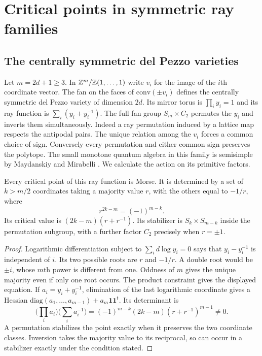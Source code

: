 \section{Critical points in symmetric ray families}\label{sec:example}

\subsection{The centrally symmetric del Pezzo varieties}
Let $m=2d+1\ge3$. In $\mathbb Z^m/\mathbb Z(1,\ldots,1)$ write $v_i$ for the image of the $i$th coordinate vector. The fan on the faces of $\mathrm{conv}(\pm v_i)$ defines the centrally symmetric del Pezzo variety of dimension $2d$. Its mirror torus is $\prod_i y_i=1$ and its ray function is $\sum_i(y_i+y_i^{-1})$. The full fan group $S_m\times C_2$ permutes the $y_i$ and inverts them simultaneously. Indeed a ray permutation induced by a lattice map respects the antipodal pairs. The unique relation among the $v_i$ forces a common choice of sign. Conversely every permutation and either common sign preserves the polytope. The small monotone quantum algebra in this family is semisimple by Maydanskiy and Mirabelli \cite{MM}. We calculate the action on its primitive factors.

\begin{proposition}
Every critical point of this ray function is Morse. It is determined by a set of $k>m/2$ coordinates taking a majority value $r$, with the others equal to $-1/r$, where
\[
             r^{2k-m}=(-1)^{m-k}.
\]
Its critical value is $(2k-m)(r+r^{-1})$. Its stabilizer is $S_k\times S_{m-k}$ inside the permutation subgroup, with a further factor $C_2$ precisely when $r=\pm1$.
\end{proposition}
\begin{proof}
Logarithmic differentiation subject to $\sum_i d\log y_i=0$ says that $y_i-y_i^{-1}$ is independent of $i$. Its two possible roots are $r$ and $-1/r$. A double root would be $\pm i$, whose $m$th power is different from one. Oddness of $m$ gives the unique majority even if only one root occurs. The product constraint gives the displayed equation. If $a_i=y_i+y_i^{-1}$, elimination of the last logarithmic coordinate gives a Hessian $\mathrm{diag}(a_1,\dots,a_{m-1})+a_m\mathbf1\mathbf1^t$. Its determinant is
\[
 \Big(\prod_i a_i\Big)\Big(\sum_i a_i^{-1}\Big)
       =(-1)^{m-k}(2k-m)(r+r^{-1})^{m-1}\ne0 .
\]
A permutation stabilizes the point exactly when it preserves the two coordinate classes. Inversion takes the majority value to its reciprocal, so can occur in a stabilizer exactly under the condition stated.
\end{proof}

